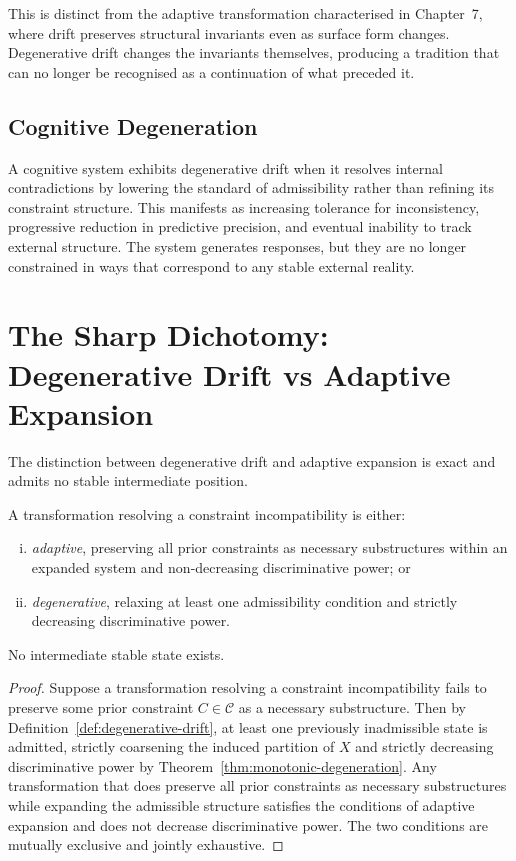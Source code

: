 \documentclass[11pt,openany]{book}
\begin{document}
This is distinct from the adaptive transformation
characterised in Chapter~7, where drift preserves
structural invariants even as surface form changes.
Degenerative drift changes the invariants themselves,
producing a tradition that can no longer be recognised as
a continuation of what preceded it.

\subsection{Cognitive Degeneration}
\label{subsec:cognitive}

A cognitive system exhibits degenerative drift when it
resolves internal contradictions by lowering the standard
of admissibility rather than refining its constraint
structure.  This manifests as increasing tolerance for
inconsistency, progressive reduction in predictive
precision, and eventual inability to track external
structure.  The system generates responses, but they are
no longer constrained in ways that correspond to any
stable external reality.

\section{The Sharp Dichotomy: Degenerative Drift
  vs Adaptive Expansion}
\label{sec:comparison}

The distinction between degenerative drift and adaptive
expansion is exact and admits no stable intermediate
position.

\begin{proposition}
\label{prop:dichotomy}
A transformation resolving a constraint incompatibility is
either:
\begin{enumerate}[(i)]
  \item \emph{adaptive}, preserving all prior constraints as
    necessary substructures within an expanded system and
    non-decreasing discriminative power; or
  \item \emph{degenerative}, relaxing at least one
    admissibility condition and strictly decreasing
    discriminative power.
\end{enumerate}
No intermediate stable state exists.
\end{proposition}

\begin{proof}
Suppose a transformation resolving a constraint
incompatibility fails to preserve some prior constraint
$C \in \mathcal{C}$ as a necessary substructure.  Then by
Definition~\ref{def:degenerative-drift}, at least one
previously inadmissible state is admitted, strictly
coarsening the induced partition of $X$ and strictly
decreasing discriminative power by
Theorem~\ref{thm:monotonic-degeneration}.  Any
transformation that does preserve all prior constraints as
necessary substructures while expanding the admissible
structure satisfies the conditions of adaptive expansion
and does not decrease discriminative power.  The two
conditions are mutually exclusive and jointly exhaustive.
\end{proof}
\end{document}
